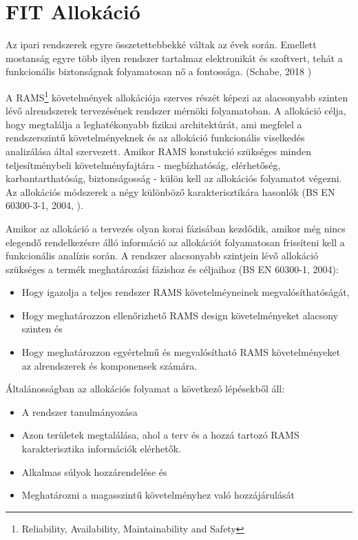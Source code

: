\section{FIT Allokáció} \label{sec:fit_allocation}
Az ipari rendszerek egyre összetettebbekké váltak az évek során. 
Emellett mostanság egyre több ilyen rendszer tartalmaz elektronikát és szoftvert, 
tehát a funkcionális biztonságnak folyamatosan nő a fontossága. (Schabe, 2018 \cite{Schabe})

A RAMS\footnote{Reliability, Availability, Maintainability and Safety} követelmények allokációja szerves részét képezi az alacsonyabb szinten lévő alrendszerek tervezésének rendszer mérnöki folyamatoban.
A allokáció célja, hogy megtalálja a leghatékonyabb fizikai architektúrát, ami megfelel a rendszerszintű követelményeknek és az allokáció funkcionális viselkedés analizálása által szervezett.
Amikor RAMS konstukció szükséges minden teljesítménybeli követelményfajtára - megbízhatóság, elérhetőség, karbantarthatóság, biztonságosság - külön kell az allokációs folyamatot végezni.
Az allokációs módszerek a négy különböző karakterisztikára hasonlók (BS EN 60300-3-1, 2004, \cite{en60300-3-1}).

Amikor az allokáció a tervezés olyan korai fázisában kezdődik, amikor még nincs elegendő rendelkezésre álló információ az allokációt folyamatosan frissíteni kell a funkcionális analízis során.
A rendszer alacsonyabb szintjein lévő allokáció szükséges a termék meghatározási fázishoz és céljaihoz (BS EN 60300-1, 2004):
\begin{itemize}
	\item Hogy igazolja a teljes rendszer RAMS követelméyneinek megvalósíthatóságát,
	\item Hogy meghatározzon ellenőrizhető RAMS design követelményeket alacsony szinten és
	\item Hogy meghatározzon egyértelmű és megvalósítható RAMS követelményeket az alrendszerek és komponensek számára.
\end{itemize}
Általánosságban az allokációs folyamat a következő lépésekből áll:
\begin{itemize}
	\item A rendszer tanulmányozása
	\item Azon területek megtalálása, ahol a terv és a hozzá tartozó RAMS karakterisztika információk elérhetők.
	\item Alkalmas súlyok hozzárendelése és
	\item Meghatározni a magasszintű követelményhez való hozzájárulását
\end{itemize}


